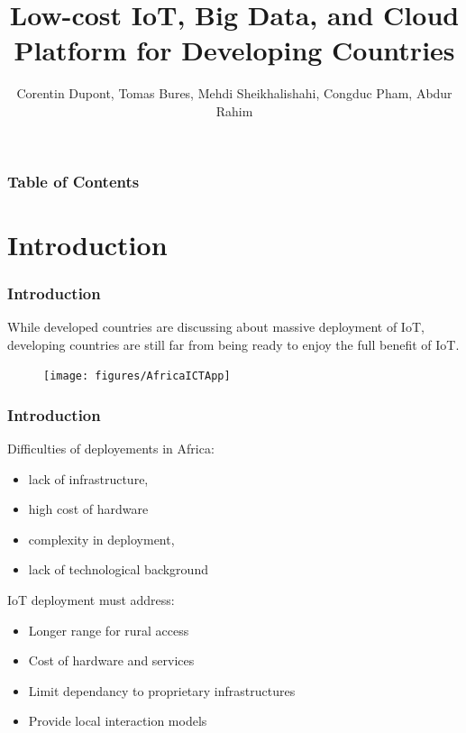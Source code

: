 \documentclass{beamer}
\begin{document}
\title{Low-cost IoT, Big Data, and Cloud Platform for Developing Countries}
\author{Corentin Dupont, Tomas Bures, Mehdi Sheikhalishahi, Congduc Pham, Abdur Rahim}		 



\maketitle

\begin{frame}
  \frametitle{Table of Contents}
  \tableofcontents[]
\end{frame}


\section{Introduction}
\begin{frame}
\frametitle{Introduction}
  
While developed countries are discussing about massive deployment of IoT, developing countries are still far from being ready to enjoy the full benefit of IoT.

  \begin{figure}[H]  
  \centering  
  \texttt{[image: figures/AfricaICTApp]}  
  \label{figure-AfricaICTApp}  
  \end{figure}

\end{frame}

\begin{frame}
\frametitle{Introduction}
  
  Difficulties of deployements in Africa:
  \begin{itemize}
    \item lack of infrastructure, 
    \item high cost of hardware
    \item complexity in deployment, 
    \item lack of technological background
  \end{itemize}

  IoT deployment must address:
  \begin{itemize}
    \item Longer range for rural access
    \item Cost of hardware and services
    \item Limit dependancy to proprietary infrastructures
    \item Provide local interaction models
  \end{itemize}

\end{frame}
\end{document}
